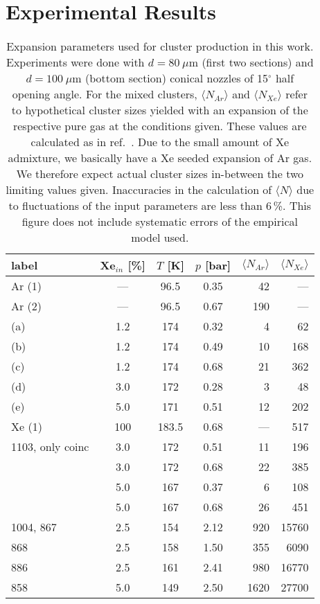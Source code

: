 \section{Experimental Results}
\begin{table}
\caption{
Expansion parameters used for cluster production in this work. Experiments were done with $d = 80~\mu$m (first two sections) and $d = 100~\mu$m (bottom section) conical nozzles of 15$^\circ$ half opening angle. For the mixed clusters, $\langle N_{Ar} \rangle$ and $\langle N_{Xe} \rangle$ refer to hypothetical cluster sizes yielded with an expansion of the respective pure gas at the conditions given. These values are calculated as in ref.\ \protect{}. Due to the small amount of Xe admixture, we basically have a Xe seeded expansion of Ar gas. We therefore expect actual cluster sizes in-between the two limiting values given. Inaccuracies in the calculation of $\langle N\rangle$ due to fluctuations of the input parameters are less than 6\,\%. This figure does not include systematic errors of the empirical model used.
\label{tab:cluster} }

\begin{tabular}{l c c c r r}
%
\toprule
  label  &  Xe$_{in}$ [\%]  &  $T$ [K]  &  $p$ [bar] & $\langle N_{Ar} \rangle$ & $\langle N_{Xe} \rangle$ \\
%
\midrule
Ar (1)  & --- &  96.5  & 0.35  &  42  &  --- \\
Ar (2)  & --- &  96.5  & 0.67  & 190  &  --- \\
 (a) & 1.2 &  174   & 0.32  &   4  &   62 \\
 (b) & 1.2 &  174   & 0.49  &  10  &  168 \\
 (c) & 1.2 &  174   & 0.68  &  21  &  362 \\
 (d) & 3.0 &  172   & 0.28  &   3  &   48 \\
 (e) & 5.0 &  171   & 0.51  &  12  &  202 \\
Xe (1)  & 100 & 183.5  & 0.68  & ---  &  517 \\     
\midrule
1103, only coinc  & 3.0 &  172   & 0.51  &  11  &  196 \\
  & 3.0 &  172   & 0.68  &  22  &  385 \\
  & 5.0 &  167   & 0.37  &   6  &  108 \\
  & 5.0 &  167   & 0.68  &  26  &  451 \\
\midrule
1004, 867  & 2.5 &  154   & 2.12  &  920 & 15760\\
868  & 2.5 &  158   & 1.50  &  355 &  6090\\
886  & 2.5 &  161   & 2.41  &  980 & 16770\\
858  & 5.0 &  149   & 2.50  & 1620 & 27700\\
%
\bottomrule
\end{tabular}
\end{table}


